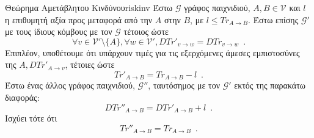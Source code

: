 {}
\begin{theoremgr}{Θεώρημα Αμετάβλητου Κινδύνου}{riskinv}
  Έστω $\mathcal{G}$ γράφος παιχνιδιού, $A, B \in \mathcal{V}$ και $l$ η επιθυμητή αξία προς μεταφορά από την $A$ στην $B$, με
  $l \leq Tr_{A \rightarrow B}$. Έστω επίσης $\mathcal{G}'$ με τους ίδιους κόμβους με τον $\mathcal{G}$ τέτοιος ώστε
  \begin{equation*}
    \forall v \in \mathcal{V}' \setminus \{A\}, \forall w \in \mathcal{V}', DTr'_{v \rightarrow w} =
    DTr_{v \rightarrow w} \enspace.
  \end{equation*}
  Επιπλέον, υποθέτουμε ότι υπάρχουν τιμές για τις εξερχόμενες άμεσες εμπιστοσύνες της $A, DTr'_{A \rightarrow v}$, τέτοιες
  ώστε
  \begin{equation}
  \label{primetrust}
    Tr'_{A \rightarrow B} = Tr_{A \rightarrow B} - l \enspace.
  \end{equation}
  Έστω ένας άλλος γράφος παιχνιδιού, $\mathcal{G}''$, ταυτόσημος με τον $\mathcal{G}'$ εκτός της παρακάτω διαφοράς:
  \begin{equation*}
    DTr''_{A \rightarrow B} = DTr'_{A \rightarrow B} + l \enspace.
  \end{equation*}
  Ισχύει τότε ότι
  \begin{equation*}
    Tr''_{A \rightarrow B} = Tr_{A \rightarrow B} \enspace.
  \end{equation*}
\end{theoremgr}
